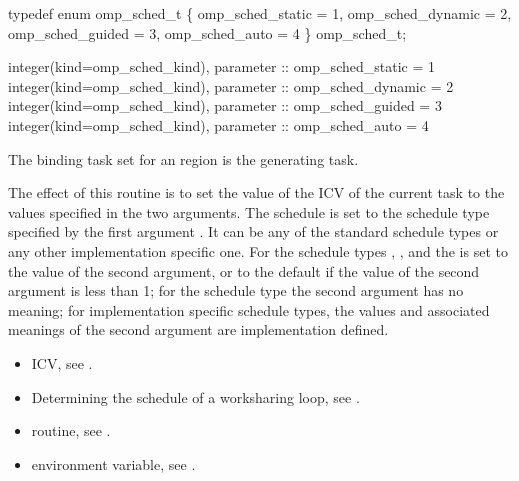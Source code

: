 \pagebreak
\begin{ccppspecific}
\begin{boxedcode}
typedef enum omp\_sched\_t \{
    omp\_sched\_static = 1,
    omp\_sched\_dynamic = 2,
    omp\_sched\_guided = 3,
    omp\_sched\_auto = 4
\} omp\_sched\_t;
\end{boxedcode}
\end{ccppspecific}

\begin{samepage}
\begin{fortranspecific}
\begin{boxedcode}
integer(kind=omp\_sched\_kind), parameter :: omp\_sched\_static = 1
integer(kind=omp\_sched\_kind), parameter :: omp\_sched\_dynamic = 2
integer(kind=omp\_sched\_kind), parameter :: omp\_sched\_guided = 3
integer(kind=omp\_sched\_kind), parameter :: omp\_sched\_auto = 4
\end{boxedcode}
\end{fortranspecific}
\end{samepage}

\binding
The binding task set for an  region is the generating task. 

\effect
The effect of this routine is to set the value of the  ICV of the current task 
to the values specified in the two arguments. The schedule is set to the schedule type 
specified by the first argument . It can be any of the standard schedule types or 
any other implementation specific one. For the schedule types , , and 
 the  is set to the value of the second argument, or to the default 
 if the value of the second argument is less than 1; for the schedule type 
 the second argument has no meaning; for implementation specific schedule types, 
the values and associated meanings of the second argument are implementation defined.

\crossreferences
\begin{itemize}
\item {} ICV, see 
.

\item Determining the schedule of a worksharing loop, see 
.

\item {} routine, see 
.

\item {} environment variable, see 
.
\end{itemize}









